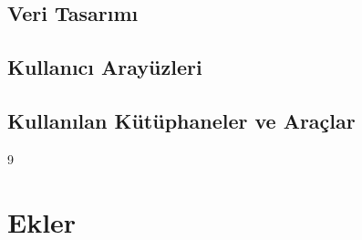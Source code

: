 \documentclass[a4paper,12pt]{report}
\begin{document}
\section{Veri Tasarımı}


\section{Kullanıcı Arayüzleri}


\section{Kullanılan Kütüphaneler ve Araçlar}


\begin{thebibliography}{9}


\end{thebibliography}

\appendix

\chapter{Ekler}

\end{document}
